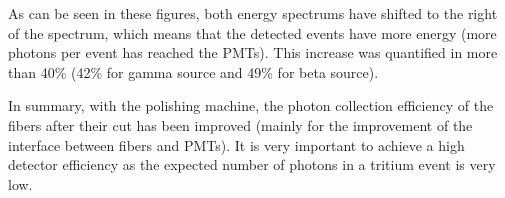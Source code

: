 As can be seen in these figures, both energy spectrums have shifted to the right of the spectrum, which means that the detected events have more energy (more photons per event has reached the PMTs). This increase was quantified in more than 40\% (42\% for gamma source and 49\% for beta source).

In summary, with the polishing machine, the photon collection efficiency of the fibers after their cut has been improved  (mainly for the improvement of the interface between fibers and PMTs). It is very important to achieve a high detector efficiency as the expected number of photons in a tritium event is very low.